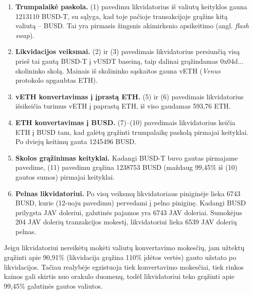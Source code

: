 \documentclass{VUMIFPSkursinis}
\begin{document}
\begin{enumerate}
  \item \textbf{Trumpalaikė paskola.}  
  (1) pavedimu likvidatorius iš valiutų keityklos gauna 1213110 BUSD-T, su sąlyga, kad toje pačioje transakcijoje grąžins kitą valiutą – BUSD. Tai yra pirmasis žingsnis akimirksnio apsikeitimo (angl. \textit{flash swap}).

  \item \textbf{Likvidacijos veiksmai.}  
  (2) ir (3) pavedimais likvidatorius persiunčią visą prieš tai gautą BUSD-T į vUSDT baseiną, taip dalinai grąžindamas 0x04d... skolininko skolą. Mainais iš skolininko sąskaitos gauna vETH (\textit{Venus} protokolo apgaubtas ETH).

  \item \textbf{vETH konvertavimas į įprastą ETH.}  
  (5) ir (6) pavedimais likvidatorius išsikeičia turimus vETH į paprastą ETH, iš viso gaudamas 593,76 ETH.

  \item \textbf{ETH konvertavimas į BUSD.}  
  (7)--(10) pavedimais likvidatorius keičia ETH į BUSD tam, kad galėtų grąžinti trumpalaikę paskolą pirmajai keityklai. Po dviejų keitimų gauta 1245496 BUSD.

  \item \textbf{Skolos grąžinimas keityklai.}  
  Kadangi BUSD-T buvo gautas pirmajame pavedime, (11) pavedimu 
  grąžina 1238753 BUSD (maždaug 99,45\% iš (10) gautos sumos) pirmajai keityklai.


  \item \textbf{Pelnas likvidatoriui.}  
Po visų veiksmų likvidatoriaus piniginėje lieka 6743 BUSD, kurie (12-uoju pavedimu) pervedami į pelno piniginę.  
Kadangi BUSD prilygsta JAV doleriui, galutinės pajamos yra 6743 JAV doleriai.  
Sumokėjus 204 JAV dolerių tranzakcijos mokestį, likvidatoriui lieka 6539 JAV dolerių pelnas.
\end{enumerate}

\noindent
Jeigu likvidatoriui nereikėtų mokėti valiutų konvertavimo mokesčių, 
jam užtektų grąžinti apie 90,91\% (likvidacija grąžina 110\% įdėtos vertės) 
gauto užstato po likvidacijos. Tačiau realybėje egzistuoja tiek 
konvertavimo mokesčiai, tiek rinkos kainos gali skirtis nuo orakulo 
duomenų, todėl likvidatoriui teko grąžinti apie 99,45\% galutinės 
gautos valiutos.
\end{document}
